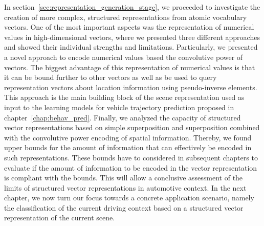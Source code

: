 In section~\ref{sec:representation_generation_stage}, we proceeded to investigate the creation of more complex, structured representations from atomic vocabulary vectors.
One of the most important aspects was the representation of numerical values in high-dimensional vectors, where we presented three different approaches and showed their individual strengths and limitations.
Particularly, we presented a novel approach to encode numerical values based the convolutive power of vectors.
The biggest advantage of this representation of numerical values is that it can be bound further to other vectors as well as be used to query representation vectors about location information using pseudo-inverse elements.
This approach is the main building block of the scene representation used as input to the learning models for vehicle trajectory prediction proposed in chapter~\ref{chap:behav_pred}.
Finally, we analyzed the capacity of structured vector representations based on simple superposition and superposition combined with the convolutive power encoding of spatial information.
Thereby, we found upper bounds for the amount of information that can effectively be encoded in such representations.
These bounds have to considered in subsequent chapters to evaluate if the amount of information to be encoded in the vector representation is compliant with the bounds.
This will allow a conclusive assessment of the limits of structured vector representations in automotive context.
In the next chapter, we now turn our focus towards a concrete application scenario, namely the classification of the current driving context based on a structured vector representation of the current scene.

